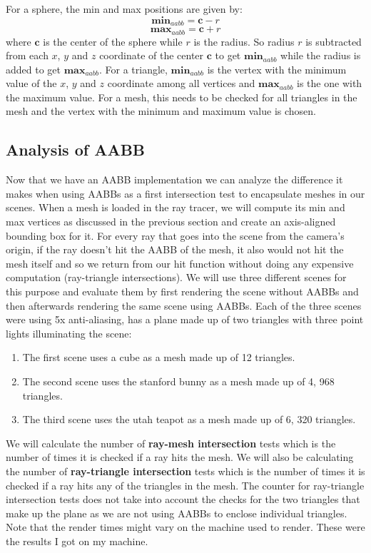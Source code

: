 \documentclass[11pt,a4paper]{article}
\begin{document}
	\noindent
	For a sphere, the min and max positions are given by:
	\begin{equation}
		\boldsymbol{min}_{aabb} = \boldsymbol{c} - r
	\end{equation}
	\begin{equation}
	\boldsymbol{max}_{aabb} = \boldsymbol{c} + r
	\end{equation}
	where $\boldsymbol{c}$ is the center of the sphere while $r$ is the radius. So radius $r$ is subtracted from each $x$, $y$ and $z$ coordinate of the center $\boldsymbol{c}$ to get $\boldsymbol{min}_{aabb}$ while the radius is added to get $\boldsymbol{max}_{aabb}$. For a triangle, $\boldsymbol{min}_{aabb}$ is the vertex with the minimum value of the $x$, $y$ and $z$ coordinate among all vertices and $\boldsymbol{max}_{aabb}$ is the one with the maximum value. For a mesh, this needs to be checked for all triangles in the mesh and the vertex with the minimum and maximum value is chosen.
	
	\subsection{Analysis of AABB}
	
	Now that we have an AABB implementation we can analyze the difference it makes when using AABBs as a first intersection test to encapsulate meshes in our scenes. When a mesh is loaded in the ray tracer, we will compute its min and max vertices as discussed in the previous section and create an axis-aligned bounding box for it. For every ray that goes into the scene from the camera's origin, if the ray doesn't hit the AABB of the mesh, it also would not hit the mesh itself and so we return from our hit function without doing any expensive computation (ray-triangle intersections). We will use three different scenes for this purpose and evaluate them by first rendering the scene without AABBs and then afterwards rendering the same scene using AABBs. Each of the three scenes were using 5x anti-aliasing, has a plane made up of two triangles with three point lights illuminating the scene:
	\begin{enumerate}
		\item The first scene uses a cube as a mesh made up of 12 triangles.
		\item The second scene uses the stanford bunny as a mesh made up of 4, 968 triangles.
		\item The third scene uses the utah teapot as a mesh made up of 6, 320 triangles.
	\end{enumerate}
	We will calculate the number of \textbf{ray-mesh intersection} tests which is the number of times it is checked if a ray hits the mesh. We will also be calculating the number of \textbf{ray-triangle intersection} tests which is the number of times it is checked if a ray hits any of the triangles in the mesh. The counter for ray-triangle intersection tests does not take into account the checks for the two triangles that make up the plane as we are not using AABBs to enclose individual triangles. Note that the render times might vary on the machine used to render. These were the results I got on my machine.
\end{document}

